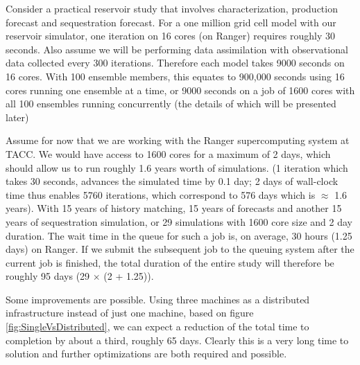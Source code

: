 \documentclass{acm_proc_article-sp}
\begin{document}
Consider a practical reservoir study that involves characterization,
production forecast and sequestration forecast. For a one million grid
cell model with our reservoir simulator, one iteration on 16 cores (on Ranger)
requires roughly 30 seconds. Also assume we will be performing data
assimilation with observational data collected every 300 iterations.
Therefore each model takes 9000 seconds on 16 cores. With 100 ensemble
members, this equates to 900,000 seconds using 16 cores running one
ensemble at a time, or 9000 seconds on a job of 1600 cores with all 100
ensembles running concurrently (the details of which will be presented
later)

Assume for now that we are working with the Ranger supercomputing
system at TACC. We would have access to 1600 cores for a maximum of 2
days, which should allow us to run roughly 1.6 years worth of
simulations. (1 iteration which takes 30 seconds, advances the
simulated time by 0.1 day; 2 days of wall-clock time thus enables 5760
iterations, which correspond to 576 days which is $\approx$ 1.6
years). With 15 years of history matching, 15 years of forecasts and
another 15 years of sequestration simulation, or 29 simulations with
1600 core size and 2 day duration. The wait time in the queue for such
a job is, on average, 30 hours (1.25 days) on Ranger. If we submit the
subsequent job to the queuing system after the current job is
finished, the total duration of the entire study will therefore be
roughly 95 days (29 $\times$ (2 + 1.25)).

Some improvements are possible. Using three machines as a
distributed infrastructure instead of just one machine, based on figure
\ref{fig:SingleVsDistributed}, we can expect a reduction of the total
time to completion by about a third, roughly 65 days. Clearly this is
a very long time to solution and further optimizations are both
required and possible.

% 
\end{document}
